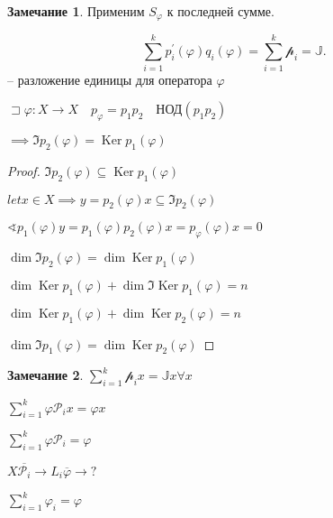 \documentclass{book}
\newcommand{\p}[1]{#1^{\prime}}
\newcommand{\ov}[1]{\overline{#1}}
\DeclareMathOperator{\Ker}{Ker}
\theoremstyle{definition}
\newtheorem*{note}{Замечание}
\begin{document}
\begin{note}
    Применим $S_{\varphi}$ к последней сумме.

     \[
         \sum_{i=1}^{k} \p p_i\left( \varphi \right) q_i\left( \varphi \right)  = \sum_{i=1}^{k} \mathscr{p}_i = \mathds{J}
    .\] -- разложение единицы для оператора $\varphi$ 
\end{note}

\begin{theorem}

    $\sqsupset \varphi:X\to X\quad p_{\varphi} = p_1p_2\quad \text{НОД}\left( p_1p_2 \right) $ 

    $\implies \Im p_2\left( \varphi \right)  = \Ker p_1\left( \varphi \right) $
\end{theorem}
\begin{proof}
    $\Im p_2\left( \varphi \right) \subseteq \Ker p_1\left( \varphi \right)$

    $let x \in X \implies y =  p_2\left( \varphi \right) x\subseteq \Im p_2\left( \varphi \right) $

    $\sphericalangle p_1\left( \varphi \right) y = p_1\left( \varphi \right) p_2\left( \varphi \right) x = p_{\varphi}\left( \varphi \right) x = 0$

    $\dim \Im p_2\left( \varphi \right)  = \dim \Ker p_1\left( \varphi \right) $ 

    $\dim \Ker p_1\left( \varphi \right)  + \dim \Im \Ker p_1\left( \varphi \right)  = n$ 

    $\dim \Ker p_1\left( \varphi \right) + \dim \Ker p_2\left( \varphi \right)  = n$

    $\dim \Im p_1\left( \varphi \right)  = \dim \Ker p_2\left( \varphi \right) $
\end{proof}

\begin{note}
    $\sum_{i=1}^{k} \mathscr{p}_ix = \mathds{J}x \forall x$ 

    $\sum_{i=1}^{k} \varphi\mathscr{P}_ix = \varphi x$ 

    $\sum_{i=1}^{k} \varphi \mathscr{P}_i = \varphi$ 

    $X \ov{\mathcal{P}_i}{\longrightarrow}L_i \ov{\varphi}{\longrightarrow}?$

     $\sum_{i=1}^{k} \varphi_i = \varphi$
\end{note}
\end{document}
